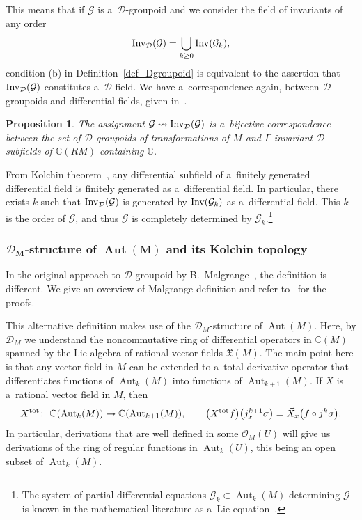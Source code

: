 \documentclass[pdftex]{sigma}
\numberwithin{equation}{section}
\newtheorem{Proposition}[Theorem]{Proposition}
\theoremstyle{definition}
\begin{document}
This means that if $\mathcal G$ is a~$\mathcal D$-groupoid and we consider the field of invariants of any order
\[{\rm Inv}_{\mathcal D}(\mathcal G) = \bigcup_{k\geq 0} {\rm Inv}(\mathcal G_k),\]
condition (b) in Definition~\ref{def_Dgroupoid} is equivalent to the assertion that ${\rm Inv}_{\mathcal D}(\mathcal G)$ constitutes a~$\mathcal D$-field. We have a~correspondence again, between $\mathcal D$-groupoids and differential fields, given in~\cite[Proposition~2.16]{bcd2022malgrange}.

\begin{Proposition}
The assignment $\mathcal G \leadsto {\rm Inv}_{\mathcal D}(\mathcal G)$ is a~bijective correspondence between the set of $\mathcal D$-groupoids of transformations of $M$ and $\Gamma$-invariant $\mathcal D$-subfields of $\mathbb C(RM)$ containing $\mathbb C$.
\end{Proposition}

{From Kolchin theorem~\cite{kolchin}, any differential subfield of a~finitely generated differential field is finitely generated as a~differential field. In particular, there exists $k$ such that ${\rm Inv}_{\mathcal D}(\mathcal G)$ is generated by ${\rm Inv}(\mathcal G_k)$ as a~differential field}. This $k$ is the order of $\mathcal G$, and thus $\mathcal G$ is completely determined by $\mathcal G_{k}$.\footnote{The system of partial differential equations $\mathcal G_k\subset \operatorname{Aut}_k(M)$ determining $\mathcal G$ is known in the mathematical literature as a~Lie equation~\cite{kumpera1972lie,munoz2000integrability}.}

\subsubsection[D\_M-structure of Aut(M) and its Kolchin topology]{$\boldsymbol{\mathcal D_M}$-structure of $\boldsymbol{\operatorname{Aut}(M)}$ and its Kolchin topology}

In the original approach to $\mathcal D$-groupoid by B.~Malgrange~\cite{malgrange2001groupoide}, the definition is different. We give an overview of Malgrange definition and refer to~\cite{davy} for the proofs.

This alternative definition makes use of the $\mathcal D_M$-structure of $\operatorname{Aut}(M)$. Here, by $\mathcal D_M$ we understand the noncommutative ring of differential operators in $\mathbb C(M)$ spanned by the Lie algebra of rational vector fields $\mathfrak X(M)$. The main point here is that any vector field in $M$ can be extended to a~total derivative operator that differentiates functions of $\operatorname{Aut}_k(M)$ into functions of $\operatorname{Aut}_{k+1}(M)$. If $X$ is a~rational vector field in $M$, then
\[X^{\rm tot}\colon\ \mathbb C(\operatorname{Aut}_k(M))\to \mathbb C(\operatorname{Aut}_{k+1}(M)),
 \qquad \bigl(X^{\rm tot}f\bigr)\bigl(j_x^{k+1}\sigma\bigr) = \vec X_x\bigl(f\circ j^k\sigma\bigr).\]
In particular, derivations that are well defined in some $\mathcal O_M(U)$ will give us derivations of the ring of regular functions in $\operatorname{Aut}_k(U)$, this being an open subset of $\operatorname{Aut}_k(M)$.
\end{document}
